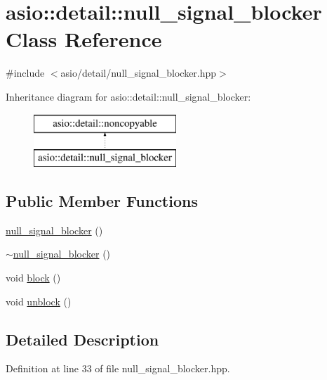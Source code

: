 \hypertarget{classasio_1_1detail_1_1null__signal__blocker}{}\section{asio\+:\+:detail\+:\+:null\+\_\+signal\+\_\+blocker Class Reference}
\label{classasio_1_1detail_1_1null__signal__blocker}


{\ttfamily \#include $<$asio/detail/null\+\_\+signal\+\_\+blocker.\+hpp$>$}

Inheritance diagram for asio\+:\+:detail\+:\+:null\+\_\+signal\+\_\+blocker\+:\begin{figure}[H]
\begin{center}
\leavevmode
\includegraphics[height=2.000000cm]{classasio_1_1detail_1_1null__signal__blocker}
\end{center}
\end{figure}
\subsection*{Public Member Functions}
\begin{DoxyCompactItemize}
\item 
\hyperlink{classasio_1_1detail_1_1null__signal__blocker_a68c8feb7f62fce4a0f4136da2b5b123b}{null\+\_\+signal\+\_\+blocker} ()
\item 
\hyperlink{classasio_1_1detail_1_1null__signal__blocker_abe712eac12fcd8c7c4a231185765338f}{$\sim$null\+\_\+signal\+\_\+blocker} ()
\item 
void \hyperlink{classasio_1_1detail_1_1null__signal__blocker_ad09f0c7acc417d1141d99c77a24f0f3c}{block} ()
\item 
void \hyperlink{classasio_1_1detail_1_1null__signal__blocker_ae021ace5ca610b50aae279ff653c6ba8}{unblock} ()
\end{DoxyCompactItemize}


\subsection{Detailed Description}


Definition at line 33 of file null\+\_\+signal\+\_\+blocker.\+hpp.



